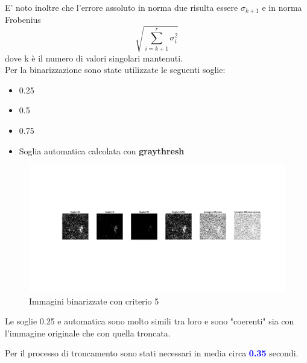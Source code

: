 \noindent
E' noto inoltre che l'errore assoluto in norma due risulta essere $\sigma_{k+1}$ e in norma Frobenius 
\begin{equation}
    \sqrt{\sum_{i=k+1}^{r}\sigma_i^2}
\end{equation}
 dove k è il numero di valori singolari mantenuti.\\
Per la binarizzazione sono state utilizzate le seguenti soglie:
\begin{itemize}
    \item 0.25
    \item 0.5
    \item 0.75
    \item Soglia automatica calcolata con \textbf{graythresh}
\end{itemize}

\begin{figure}[H]
    \centering
     \includegraphics[width=\textwidth]{images/Criterio5.jpg}
    \caption{Immagini binarizzate con criterio 5}
\end{figure}

\noindent Le soglie 0.25 e automatica sono molto simili tra loro e sono "coerenti" sia con l'immagine originale che con quella troncata.

\noindent Per il processo di troncamento sono stati necessari in media circa \textcolor{blue}{\textbf{0.35}} secondi.\\

